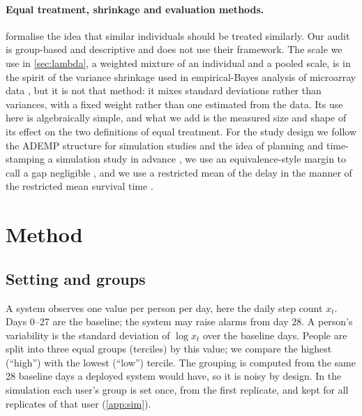 \documentclass[11pt,a4paper]{article}
\begin{document}
\paragraph{Equal treatment, shrinkage and evaluation methods.}
\citet{dwork2011} formalise the idea that similar individuals should be treated similarly. Our audit is group-based and descriptive and does not use their framework.
The scale we use in \cref{sec:lambda}, a weighted mixture of an individual and a pooled scale, is in the spirit of the variance shrinkage used in empirical-Bayes analysis of microarray data \citep{smyth2004}, but it is not that method: it mixes standard deviations rather than variances, with a fixed weight rather than one estimated from the data. Its use here is algebraically simple, and what we add is the measured size and shape of its effect on the two definitions of equal treatment.
For the study design we follow the ADEMP structure for simulation studies \citep{morris2019} and the idea of planning and time-stamping a simulation study in advance \citep{siepe2024}, we use an equivalence-style margin to call a gap negligible \citep{lakens2017}, and we use a restricted mean of the delay in the manner of the restricted mean survival time \citep{royston2013}.

\section{Method}\label{sec:method}
\subsection{Setting and groups}
A system observes one value per person per day, here the daily step count $x_t$. Days 0--27 are the baseline; the system may raise alarms from day 28.
A person's variability is the standard deviation of $\log x_t$ over the baseline days. People are split into three equal groups (terciles) by this value; we compare the highest (``high'') with the lowest (``low'') tercile.
The grouping is computed from the same 28 baseline days a deployed system would have, so it is noisy by design. In the simulation each user's group is set once, from the first replicate, and kept for all replicates of that user (\cref{app:sim}).
\end{document}
